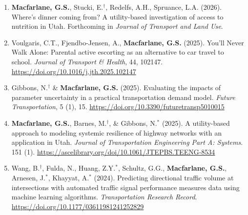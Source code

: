 \documentclass[margin,line]{res}
\newif\ifdetail{}
\newcounter{enuminitialize}
\newenvironment{myenum}[1][]
{%
 \setcounter{enuminitialize}{#1}
 \addtocounter{enuminitialize}{2}
 \begin{enumerate}[left= 4pt, itemsep=8pt, start=\value{enuminitialize}, label=\arabic*\addtocounter{enumi}{-2}]
}
{%
 \end{enumerate}
}
\begin{document}
\begin{resume}
\begin{myenum}[21]

  \ifdetail{\color{NavyBlue} \fi
  \item \textbf{Macfarlane, G.S.}, Stucki, E.$^\dagger$, Redelfs, A.H.,
  Spruance, L.A. (2026). Where’s dinner coming from? A utility-based
  investigation of access to nutrition in Utah. Forthcoming in \textit{Journal of Transport and Land Use}.
  \ifdetail }\fi
  \item Voulgaris, C.T., Fjendbo-Jensen, A.,  \textbf{Macfarlane, G.S.}
  (2025). You'll Never Walk Alone: Parental active escorting as an alternative
  to car travel to school. \textit{Journal of Transport \& Health}, 44, 102147. \url{https://doi.org/10.1016/j.jth.2025.102147}


  \item Gibbons, N.$^\dagger$  \& \textbf{Macfarlane, G.S.} (2025). 
  Evaluating the impacts of parameter uncertainty in a practical transportation
  demand model. \textit{Future Transportation}, 5 (1), 15. \url{https://doi.org/10.3390/futuretransp5010015}


  \item \textbf{Macfarlane, G.S.}, Barnes, M.$^\dagger$, \& Gibbons, N.$^*$ (2025). 
  A utility-based approach to modeling systemic resilience of highway networks with an application in Utah.
  \textit{Journal of Transportation Engineering Part A: Systems}. 151 (1). \url{https://ascelibrary.org/doi/10.1061/JTEPBS.TEENG-8534}


  \item Wang, B.$^\dagger$, Fulda, N., Huang, Z.Y.$^*$, Schultz, G.G., \textbf{Macfarlane, G.S.}, Arnesen, J.$^*$, Khayyat, A.$^*$ (2024). 
  Predicting directional traffic volume at intersections with automated traffic signal performance measures data using machine learning algorithms.
 \textit{Transportation Research Record}. \url{https://doi.org/10.1177/03611981241252829}


\end{myenum}
\end{resume}
\end{document}
